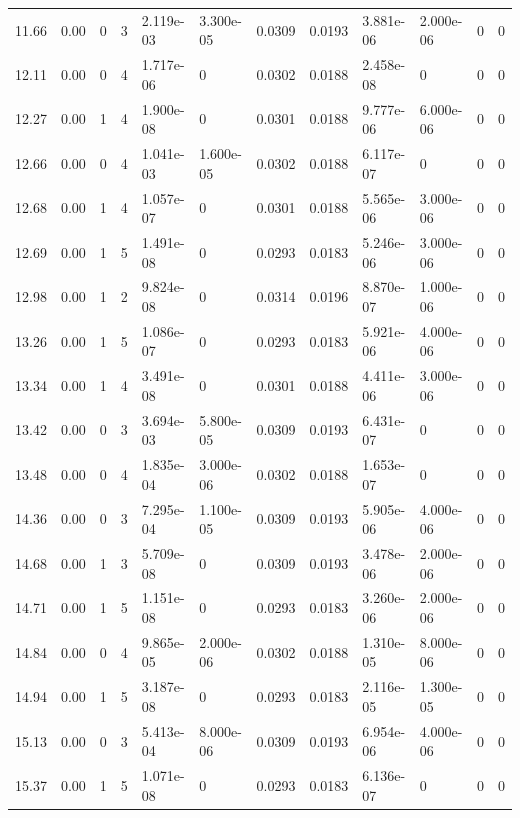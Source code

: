 \documentclass[preview]{standalone}
\begin{document}
{{{\begin{tabular}{L{1.2cm}C{1.2cm} C{0.3cm}C{0.5cm} C{1.4cm}C{1.4cm} C{1.4cm}C{1.4cm} C{1.6cm}C{1.6cm} C{1.6cm}C{1.6cm}}
  11.66  &  0.00  & 0     &  3 &  2.119e-03  & 3.300e-05  &  0.0309&   0.0193& 3.881e-06 & 2.000e-06   &  0 & 0  \\ 
  12.11  &  0.00  & 0     &  4 &  1.717e-06  & 0  &  0.0302&   0.0188& 2.458e-08 & 0   &  0 & 0  \\ 
  12.27  &  0.00  & 1     &  4 &  1.900e-08  & 0  &  0.0301&   0.0188& 9.777e-06 & 6.000e-06   &  0 & 0  \\ 
  12.66  &  0.00  & 0     &  4 &  1.041e-03  & 1.600e-05  &  0.0302&   0.0188& 6.117e-07 & 0   &  0 & 0  \\ 
  12.68  &  0.00  & 1     &  4 &  1.057e-07  & 0  &  0.0301&   0.0188& 5.565e-06 & 3.000e-06   &  0 & 0  \\ 
  12.69  &  0.00  & 1     &  5 &  1.491e-08  & 0  &  0.0293&   0.0183& 5.246e-06 & 3.000e-06   &  0 & 0  \\ 
  12.98  &  0.00  & 1     &  2 &  9.824e-08  & 0  &  0.0314&   0.0196& 8.870e-07 & 1.000e-06   &  0 & 0  \\ 
  13.26  &  0.00  & 1     &  5 &  1.086e-07  & 0  &  0.0293&   0.0183& 5.921e-06 & 4.000e-06   &  0 & 0  \\ 
  13.34  &  0.00  & 1     &  4 &  3.491e-08  & 0  &  0.0301&   0.0188& 4.411e-06 & 3.000e-06   &  0 & 0  \\ 
  13.42  &  0.00  & 0     &  3 &  3.694e-03  & 5.800e-05  &  0.0309&   0.0193& 6.431e-07 & 0   &  0 & 0  \\ 
  13.48  &  0.00  & 0     &  4 &  1.835e-04  & 3.000e-06  &  0.0302&   0.0188& 1.653e-07 & 0   &  0 & 0  \\ 
  14.36  &  0.00  & 0     &  3 &  7.295e-04  & 1.100e-05  &  0.0309&   0.0193& 5.905e-06 & 4.000e-06   &  0 & 0  \\ 
  14.68  &  0.00  & 1     &  3 &  5.709e-08  & 0  &  0.0309&   0.0193& 3.478e-06 & 2.000e-06   &  0 & 0  \\ 
  14.71  &  0.00  & 1     &  5 &  1.151e-08  & 0  &  0.0293&   0.0183& 3.260e-06 & 2.000e-06   &  0 & 0  \\ 
  14.84  &  0.00  & 0     &  4 &  9.865e-05  & 2.000e-06  &  0.0302&   0.0188& 1.310e-05 & 8.000e-06   &  0 & 0  \\ 
  14.94  &  0.00  & 1     &  5 &  3.187e-08  & 0  &  0.0293&   0.0183& 2.116e-05 & 1.300e-05   &  0 & 0  \\ 
  15.13  &  0.00  & 0     &  3 &  5.413e-04  & 8.000e-06  &  0.0309&   0.0193& 6.954e-06 & 4.000e-06   &  0 & 0  \\ 
  15.37  &  0.00  & 1     &  5 &  1.071e-08  & 0  &  0.0293&   0.0183& 6.136e-07 & 0   &  0 & 0  \\ 

\end{tabular}}}}
\end{document}
